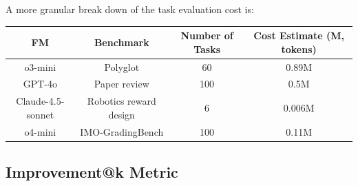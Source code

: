 \documentclass[]{fairmeta}
\begin{document}

A more granular break down of the task evaluation cost is:

\begin{table}[H]
\centering
\begin{tabular}{@{}cccc@{}}
\toprule
\textbf{FM} & \textbf{Benchmark} & \textbf{Number of Tasks} & \textbf{Cost Estimate (M, tokens)} \\ \midrule
o3-mini & Polyglot & 60 & 0.89M \\
GPT-4o & Paper review & 100 & 0.5M \\
Claude-4.5-sonnet & Robotics reward design & 6 & 0.006M \\
o4-mini & IMO-GradingBench & 100 & 0.11M \\ \bottomrule
\end{tabular}
\end{table}

\subsection{Improvement@k Metric}
\label{app:genk-metric}

\end{document}
